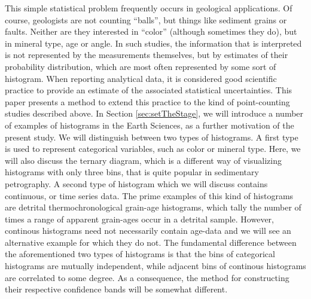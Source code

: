 \documentclass{article}
\begin{document}
This  simple  statistical  problem  frequently  occurs  in  geological
applications.  Of  course, geologists are not  counting ``balls'', but
things like sediment grains or  faults. Neither are they interested in
``color'' (although  sometimes they do),  but in mineral type,  age or
angle. In  such studies,  the information that  is interpreted  is not
represented by the measurements  themselves, but by estimates of their
probability  distribution, which  are most  often represented  by some
sort of  histogram. When reporting  analytical data, it  is considered
good  scientific practice  to provide  an estimate  of  the associated
statistical uncertainties. This paper presents a method to extend this
practice  to the kind  of point-counting  studies described  above. In
Section \ref{sec:setTheStage}, we will  introduce a number of examples
of histograms  in the Earth Sciences,  as a further  motivation of the
present study.  We will distinguish between two types of histograms. A
first type is  used to represent categorical variables,  such as color
or  mineral type.   Here, we  will also  discuss the  ternary diagram,
which is  a different  way of visualizing  histograms with  only three
bins, that is quite popular  in sedimentary petrography. A second type
of histogram which we will discuss contains continuous, or time series
data.   The prime  examples of  this kind  of histograms  are detrital
thermochronological  grain-age histograms, which  tally the  number of
times  a range  of apparent  grain-ages  occur in  a detrital  sample.
However,  continous histograms need  not necessarily  contain age-data
and we  will see an  alternative example for  which they do  not.  The
fundamental  difference  between   the  aforementioned  two  types  of
histograms  is that the  bins of  categorical histograms  are mutually
independent,   while  adjacent  bins   of  continous   histograms  are
correlated  to  some  degree.    As  a  consequence,  the  method  for
constructing  their  respective  confidence  bands  will  be  somewhat
different.\\
\end{document}
